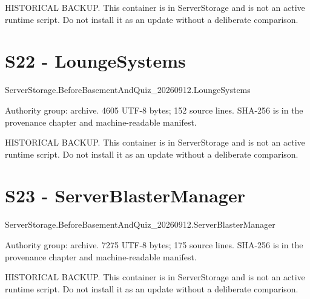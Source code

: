 HISTORICAL BACKUP.\allowbreak{} This container is in ServerStorage and is not an active runtime script.\allowbreak{} Do not install it as an update without a deliberate comparison.\allowbreak{}

\begingroup{}
\endgroup
\chapter{S22 - LoungeSystems}
\label{src:S22}
ServerStorage.\allowbreak{}BeforeBasementAndQuiz\_\allowbreak{}20260912.\allowbreak{}LoungeSystems

Authority group: archive.\allowbreak{} 4605 UTF-8 bytes; 152 source lines.\allowbreak{} SHA-256 is in the provenance chapter and machine-readable manifest.\allowbreak{}

HISTORICAL BACKUP.\allowbreak{} This container is in ServerStorage and is not an active runtime script.\allowbreak{} Do not install it as an update without a deliberate comparison.\allowbreak{}

\begingroup{}
\endgroup
\chapter{S23 - ServerBlasterManager}
\label{src:S23}
ServerStorage.\allowbreak{}BeforeBasementAndQuiz\_\allowbreak{}20260912.\allowbreak{}ServerBlasterManager

Authority group: archive.\allowbreak{} 7275 UTF-8 bytes; 175 source lines.\allowbreak{} SHA-256 is in the provenance chapter and machine-readable manifest.\allowbreak{}

HISTORICAL BACKUP.\allowbreak{} This container is in ServerStorage and is not an active runtime script.\allowbreak{} Do not install it as an update without a deliberate comparison.\allowbreak{}

\begingroup{}
\endgroup
